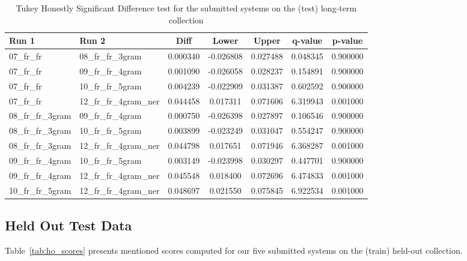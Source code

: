 \begin{table}[h!]
    \centering
    \caption{Tukey Honestly Significant Difference test for the submitted systems on the (test) long-term collection}
    \label{tab:lt_comparison}
    \begin{tabular}{|l|l||c|c|c|c|c|}
        \hline
        \textbf{Run 1} & \textbf{Run 2} & \textbf{Diff} & \textbf{Lower} & \textbf{Upper} & \textbf{q-value} & \textbf{p-value} \\ \hline\hline
        07\_fr\_fr & 08\_fr\_fr\_3gram & 0.000340 & -0.026808 & 0.027488 & 0.048345 & 0.900000 \\ \hline
        07\_fr\_fr & 09\_fr\_fr\_4gram & 0.001090 & -0.026058 & 0.028237 & 0.154891 & 0.900000 \\ \hline
        07\_fr\_fr & 10\_fr\_fr\_5gram & 0.004239 & -0.022909 & 0.031387 & 0.602592 & 0.900000 \\ \hline
        07\_fr\_fr & 12\_fr\_fr\_4gram\_ner & 0.044458 & 0.017311 & 0.071606 & 6.319943 & 0.001000 \\ \hline
        08\_fr\_fr\_3gram & 09\_fr\_fr\_4gram & 0.000750 & -0.026398 & 0.027897 & 0.106546 & 0.900000 \\ \hline
        08\_fr\_fr\_3gram & 10\_fr\_fr\_5gram & 0.003899 & -0.023249 & 0.031047 & 0.554247 & 0.900000 \\ \hline
        08\_fr\_fr\_3gram & 12\_fr\_fr\_4gram\_ner & 0.044798 & 0.017651 & 0.071946 & 6.368287 & 0.001000 \\ \hline
        09\_fr\_fr\_4gram & 10\_fr\_fr\_5gram & 0.003149 & -0.023998 & 0.030297 & 0.447701 & 0.900000 \\ \hline
        09\_fr\_fr\_4gram & 12\_fr\_fr\_4gram\_ner & 0.045548 & 0.018400 & 0.072696 & 6.474833 & 0.001000 \\ \hline
        10\_fr\_fr\_5gram & 12\_fr\_fr\_4gram\_ner & 0.048697 & 0.021550 & 0.075845 & 6.922534 & 0.001000 \\ \hline
    \end{tabular}
\end{table}

\subsection{Held Out Test Data}\label{subsec:held_out}

Table~\ref{tab:ho_scores} presents mentioned scores computed for our five submitted systems on the (train)
held-out collection.\\

